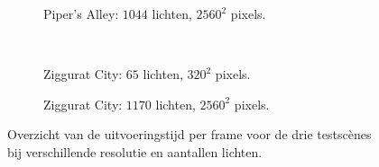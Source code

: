 \begin{figure}[t]
  \begin{adjustbox}{minipage=\textwidth, scale=0.55}
    \begin{subfigure}[b]{0.8\textwidth}
      \centering
      \def\svgwidth{\textwidth}
      
      \caption{Piper's Alley: $1044$ lichten, $2560^2$ pixels.}
      \label{fig:fds-test-frames:alley-high}
    \end{subfigure}
  \end{adjustbox} \\
  \begin{adjustbox}{minipage=\textwidth, scale=0.55}
    \begin{subfigure}[b]{0.8\textwidth}
      \centering
      \def\svgwidth{\textwidth}
      
      \caption{Ziggurat City: $65$ lichten, $320^2$ pixels.}
      \label{fig:fds-test-frames:city-low}
    \end{subfigure}
  \end{adjustbox}\hspace{-0.075\textwidth} %
  \begin{adjustbox}{minipage=\textwidth, scale=0.55}
    \begin{subfigure}[b]{0.8\textwidth}
      \centering
      \def\svgwidth{\textwidth}
      
      \caption{Ziggurat City: $1170$ lichten, $2560^2$ pixels.}
      \label{fig:fds-test-frames:city-high}
    \end{subfigure}
  \end{adjustbox}
  \caption{Overzicht van de uitvoeringstijd per frame voor de drie testsc\`enes
           bij verschillende resolutie en aantallen lichten.}
  \label{fig:fds-test-frames}
\end{figure}


